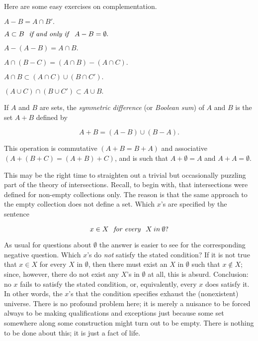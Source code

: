 Here are some easy exercises on complementation. 

\begin{center}
$A - B = A \cap B'.$

$A \subset B \text{ \textit{ if and only if } } A - B = \emptyset .$

$A - (A - B) = A \cap B.$

$A \cap (B - C) = (A \cap B) - (A \cap C).$

$A \cap B  \subset (A \cap C) \cup (B \cap C').$

$(A \cup C) \cap (B \cup C') \subset A \cup B.$
\end{center}

If $A$ and $B$ are sets, the \textit{symmetric difference} (or \textit{Boolean sum}) of $A$ and $B$ is the set $A + B$ defined by 

\begin{equation*}
A + B = (A - B) \cup (B - A). 
\end{equation*}

This operation is commutative $(A + B = B + A)$ and associative $(A + (B + C) =  (A + B) + C)$, and is such that $A + \emptyset = A$ and $A + A = \emptyset$.

This may be the right time to straighten out a trivial but occasionally puzzling part of the theory of intersections. Recall, to begin with, that intersections were defined for non-empty collections only. The reason is that the same approach to the empty collection does not define a set. Which $x$'s are specified by the sentence 

\begin{equation*}
x \in X \text{ \textit{ for every } } X \: in \: \emptyset ? 
\end{equation*}


As usual for questions about $ \emptyset $ the answer is easier to see for the corresponding negative question. Which $x$'s do \textit{not} satisfy the stated condition? If it is not true that $x \in X$ for every $X$ in $\emptyset$, then there must exist an $X$ in $\emptyset$ such that $x \notin X$; since, however, there do not exist any $X$'s in $ \emptyset $ at all, this is absurd. Conclusion: no $x$ fails to satisfy the stated condition, or, equivalently, every $x$ does satisfy it. In other words, the $x$'s that the condition specifies exhaust the (nonexistent) universe. There is no profound problem here; it is merely a nuisance to be forced always to be making qualifications and exceptions just because some set somewhere along some construction might turn out to be empty. There is nothing to be done about this; it is just a fact of life. 

